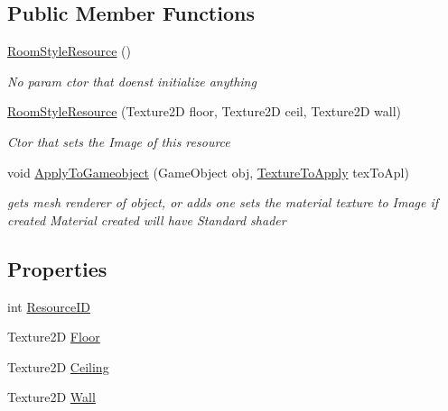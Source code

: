 \subsection*{Public Member Functions}
\begin{DoxyCompactItemize}
\item 
\mbox{\hyperlink{class_room_style_resource_a207acd092d1aac00169f329097e836fc}{Room\+Style\+Resource}} ()
\begin{DoxyCompactList}\small\item\em No param ctor that doens\textquotesingle{}t initialize anything \end{DoxyCompactList}\item 
\mbox{\hyperlink{class_room_style_resource_aa269ae01fc600ab23b7f7ce6a742a3f5}{Room\+Style\+Resource}} (Texture2D floor, Texture2D ceil, Texture2D wall)
\begin{DoxyCompactList}\small\item\em Ctor that sets the Image of this resource \end{DoxyCompactList}\item 
void \mbox{\hyperlink{class_room_style_resource_a631919fd4d90b01b2bfad87a30a6b7b2}{Apply\+To\+Gameobject}} (Game\+Object obj, \mbox{\hyperlink{class_room_style_resource_a877062d3830671f8376cc30340cdb45f}{Texture\+To\+Apply}} tex\+To\+Apl)
\begin{DoxyCompactList}\small\item\em gets mesh renderer of object, or adds one sets the material texture to Image if created Material created will have Standard shader \end{DoxyCompactList}\end{DoxyCompactItemize}
\subsection*{Properties}
\begin{DoxyCompactItemize}
\item 
int \mbox{\hyperlink{class_room_style_resource_a113194d661027fdac0a956cdf19dc166}{Resource\+ID}}
\item 
Texture2D \mbox{\hyperlink{class_room_style_resource_a9bb9edda92402b8e4889a168dfa13d6a}{Floor}}
\item 
Texture2D \mbox{\hyperlink{class_room_style_resource_ab07f5729c88a8a7229e1e625ef859d38}{Ceiling}}
\item 
Texture2D \mbox{\hyperlink{class_room_style_resource_a7e7f15cc941b23c889b3ff8f1b05e732}{Wall}}
\end{DoxyCompactItemize}



